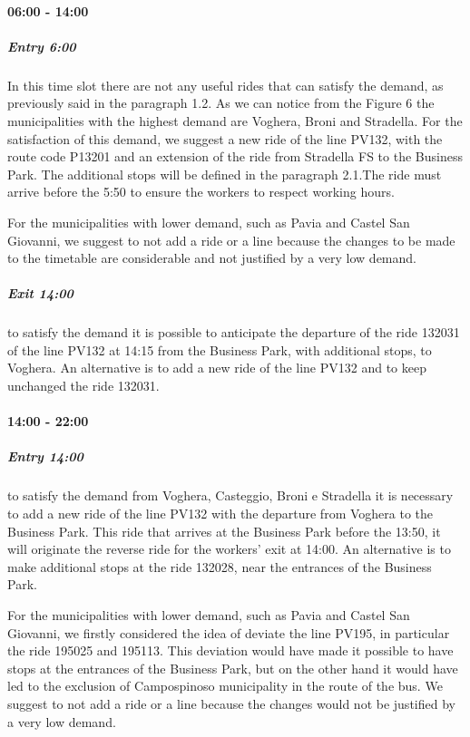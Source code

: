 \paragraph{06:00 - 14:00}

\subparagraph{Entry 6:00} In this time slot there are not any useful rides that can satisfy the demand, as previously said in the paragraph 1.2. As we can notice from the Figure 6 the municipalities with the highest demand are Voghera, Broni and Stradella. For the satisfaction of this demand, we suggest a new ride of the line PV132, with the route code P13201 and an extension of the ride from Stradella FS to the Business Park. The additional stops will be defined in the paragraph 2.1.The ride must arrive before the 5:50 to ensure the workers to respect working hours.

For the municipalities with lower demand, such as Pavia and Castel San Giovanni, we suggest to not add a ride or a line because the changes to be made to the timetable are considerable and not justified by a very low demand.

\subparagraph{Exit 14:00} to satisfy the demand it is possible to anticipate the departure of the ride 132031 of the line PV132 at 14:15 from the Business Park, with additional stops, to Voghera.
An alternative is to add a new ride of the line PV132 and to keep unchanged the ride 132031.

\paragraph{14:00 - 22:00}

\subparagraph{Entry 14:00} to satisfy the demand from Voghera, Casteggio, Broni e Stradella it is necessary to add a new ride of the line PV132 with the departure from Voghera to the Business Park. This ride that arrives at the Business Park before the 13:50, it will originate the reverse ride for the workers’ exit at 14:00.
An alternative is to make additional stops at the ride 132028, near the entrances of the Business Park.

For the municipalities with lower demand, such as Pavia and Castel San Giovanni, we firstly considered the idea of deviate the line PV195, in particular the ride 195025 and 195113. This deviation would have made it possible to have stops at the entrances of the Business Park, but on the other hand it would have led to the exclusion of Campospinoso municipality in the route of the bus. We suggest to not add a ride or a line because the changes would not be justified by a very low demand.

